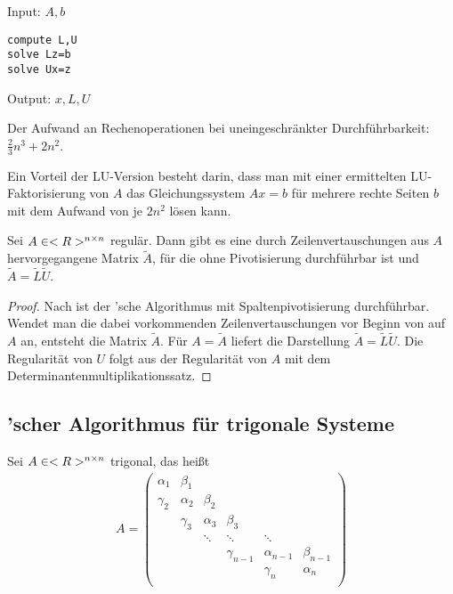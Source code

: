 \begin{algorithm}
	Input: $A,b$
	\begin{lstlisting}
compute L,U
solve Lz=b
solve Ux=z
	\end{lstlisting}
	Output: $x,L,U$
\end{algorithm}

Der Aufwand an Rechenoperationen bei uneingeschränkter Durchführbarkeit: $\frac{2}{3}n^3 + 2n^2$.

Ein Vorteil der LU-Version besteht darin, dass man mit einer ermittelten LU-Faktorisierung von $A$ das Gleichungssystem $Ax=b$ für mehrere rechte Seiten $b$ mit dem Aufwand von je $2n^2$ lösen kann.

\begin{proposition}
	Sei $A\in<R>^{n\times n}$ regulär. Dann gibt es eine durch Zeilenvertauschungen aus $A$ hervorgegangene Matrix $\tilde{A}$, für die  ohne Pivotisierung durchführbar ist und $\tilde{A}=\tilde{L}\tilde{U}$.
\end{proposition}
\begin{proof}
	Nach  ist der 'sche Algorithmus mit Spaltenpivotisierung durchführbar. Wendet man die dabei vorkommenden Zeilenvertauschungen vor Beginn von  auf $A$ an, entsteht die Matrix $\tilde{A}$. Für $A=\tilde{A}$ liefert  die Darstellung $\tilde{A}=\tilde{L}\tilde{U}$. Die Regularität von $U$ folgt aus der Regularität von $A$ mit dem Determinantenmultiplikationssatz.
\end{proof}

\subsection{'scher Algorithmus für trigonale Systeme}

Sei $A\in<R>^{n\times n}$ trigonal, das heißt
\begin{align}
	\label{3.3}
	A = \begin{pmatrix}
		\alpha_1 & \beta_1 & & & & \\
		\gamma_2 & \alpha_2 & \beta_2 & & & \\
		& \gamma_3 & \alpha_3 & \beta_3 & & \\
		& & \ddots & \ddots & \ddots & \\
		& & & \gamma_{n-1} & \alpha_{n-1} & \beta_{n-1} \\
		& & & & \gamma_n & \alpha_n \\
	\end{pmatrix}
\end{align}

